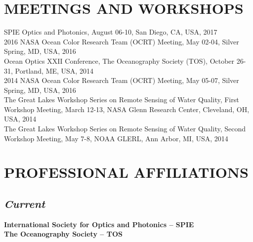 \documentclass[11pt]{res} %
\begin{document}
\begin{resume}
\section{MEETINGS AND WORKSHOPS}
\vspace{0.1in}
SPIE Optics and Photonics,  August 06-10, San Diego, CA, USA, 2017
\vspace{0.1in}\\
2016 NASA Ocean Color Research Team (OCRT) Meeting,  May 02-04, Silver Spring, MD, USA, 2016
\vspace{0.1in}\\
Ocean Optics XXII Conference, The Oceanography Society (TOS),  October 26-31, Portland, ME, USA, 2014
\vspace{0.1in}\\
2014 NASA Ocean Color Research Team (OCRT) Meeting,  May 05-07, Silver Spring, MD, USA, 2016
\vspace{0.1in}\\
The Great Lakes Workshop Series on Remote Sensing of Water Quality, First Workshop Meeting, March 12-13, NASA Glenn Research Center, Cleveland, OH, USA, 2014
\vspace{0.1in}\\
The Great Lakes Workshop Series on Remote Sensing of Water Quality, Second Workshop Meeting, May 7-8, NOAA GLERL, Ann Arbor, MI, USA, 2014\\


\vspace{-0.1in}
\section{PROFESSIONAL AFFILIATIONS}
\vspace{-0.1in}
\subsection{\it Current}
\vspace{-0.2in}
{\bf International Society for Optics and Photonics -- SPIE}
\vspace{0.1in}\\
{\bf The Oceanography Society -- TOS}
\vspace{-0.2in}

\end{resume}
\end{document}
